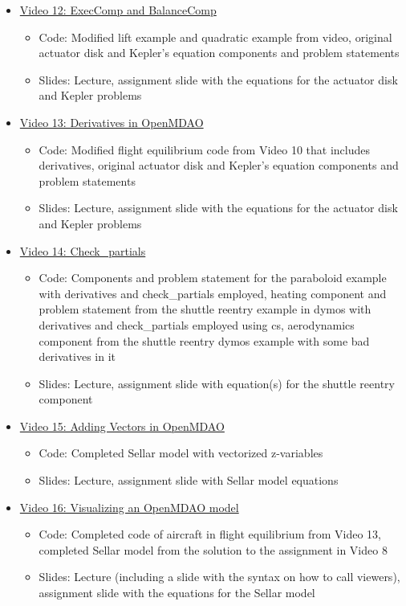 \documentclass[12pt, letterpaper]{article}
\begin{document}
\begin{itemize}
	\item \underline{Video 12: ExecComp and BalanceComp} 
		\begin{itemize}
			\item Code: Modified lift example and quadratic example from video, original actuator disk and Kepler's equation components and problem statements
			\item Slides: Lecture, assignment slide with the equations for the actuator disk and Kepler problems
		\end{itemize}

	\item \underline{Video 13: Derivatives in OpenMDAO} 
		\begin{itemize}
			\item Code: Modified flight equilibrium code from Video 10 that includes derivatives, original actuator disk and Kepler's equation components and problem statements
			\item Slides: Lecture, assignment slide with the equations for the actuator disk and Kepler problems
		\end{itemize}

	\item \underline{Video 14: Check\_partials} 
		\begin{itemize}
			\item Code: Components and problem statement for the paraboloid example with derivatives and check\_partials employed, heating component and problem statement from the shuttle reentry example in dymos with derivatives and check\_partials employed using cs, aerodynamics component from the shuttle reentry dymos example with some bad derivatives in it
			\item Slides: Lecture, assignment slide with equation(s) for the shuttle reentry component
		\end{itemize}

	\item \underline{Video 15: Adding Vectors in OpenMDAO} 
		\begin{itemize}
			\item Code: Completed Sellar model with vectorized z-variables
			\item Slides: Lecture, assignment slide with Sellar model equations
		\end{itemize}
		
	\item \underline{Video 16: Visualizing an OpenMDAO model} 
		\begin{itemize}
			\item Code: Completed code of aircraft in flight equilibrium from Video 13, completed Sellar model from the solution to the assignment in Video 8
			\item Slides: Lecture (including a slide with the syntax on how to call viewers), assignment slide with the equations for the Sellar model
		\end{itemize}


\end{itemize}
\end{document}
